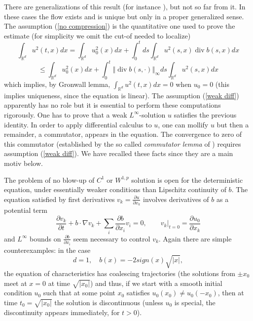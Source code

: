\documentclass{article}
\begin{document}
There are generalizations of this result (for instance \cite{Ambrosio}), but
not so far from it. In these cases the flow exists and is unique but only in a
proper generalized sense. The assumption (\ref{no compression}) is the
quantitative one used to prove the estimate (for simplicity we omit the cut-of
needed to localize)%
\[
\int_{{\mathbb R}^d}u^{2}\left(  t,x\right)  dx= \int_{{\mathbb
R}^d}u_{0}^{2}\left(  x\right)  dx+\int _{0}^{t}ds \int_{{\mathbb
R}^d}u^{2}\left(  s,x\right) \operatorname{div}b\left(s,  x\right)
dx
\]%
\[
\leq\int_{{\mathbb R}^d}u_{0}^{2}\left(  x\right)
dx+\int_{0}^{t}\left\Vert \operatorname{div}b\left(  s, \cdot
\right) \right\Vert _{\infty}ds \int_{{\mathbb R}^d}u^{2}\left(
s,x\right)  dx
\]
which implies, by Gronwall lemma, $\int_{{\mathbb R}^d}u^{2}\left(
t,x\right)  dx=0$ when $u_{0}=0$ (this implies uniqueness, since the
equation is linear). The assumption (\ref{weak diff}) apparently has
no role but it is essential to perform these computations
rigorously. One has to prove that a weak $L^{\infty}$-solution $u$
satisfies the previous identity. In order to apply differential
calculus to $u$, one can mollify $u$ but then a remainder, a
commutator, appears in the equation. The convergence to zero of this
commutator (established by the so called \textit{commutator lemma}
of \cite{DiPernaLions}) requires assumption (\ref{weak diff}). We
have recalled these facts since they are a main motiv below.

The problem of no blow-up of $C^{1}$ or $W^{1,p}$ solution is open for the
deterministic equation, under essentially weaker conditions than Lipschitz
continuity of $b$. The equation satisfied by first derivatives $v_{k}%
=\frac{\partial u}{\partial x_{k}}$ involves derivatives of $b$ as a potential
term%
\[
\frac{\partial v_{k}}{\partial t}+b\cdot\nabla v_{k}+\sum_{i}\frac{\partial
b}{\partial x_{i}}v_{i}=0,\qquad v_{k}|_{t=0}=\frac{\partial u_{0}}{\partial
x_{k}}%
\]
and $L^{\infty}$ bounds on $\frac{\partial b}{\partial x_{i}}$ seem necessary
to control $v_{k}$. Again there are simple counterexamples: in the case
\[
d=1,\quad b\left(  x\right)  =-2sign\left(  x\right)  \sqrt{\left\vert
x\right\vert },%
\]
the equation of characteristics has coalescing trajectories (the
solutions from $\pm x_{0}$ meet at $x=0$ at time $\sqrt{\left\vert
x_{0}\right\vert }$) and thus, if we start with a smooth initial
condition $u_{0}$ such that at some point $x_{0}$ satisfies
$u_{0}\left(  x_{0}\right)  \neq u_{0}\left( -x_{0}\right)  $, then
at time $t_{0}=\sqrt{\left\vert x_{0}\right\vert }$ the solution is
discontinuous (unless $u_{0}$ is special, the discontinuity appears
immediately, for $t>0$).
\end{document}
